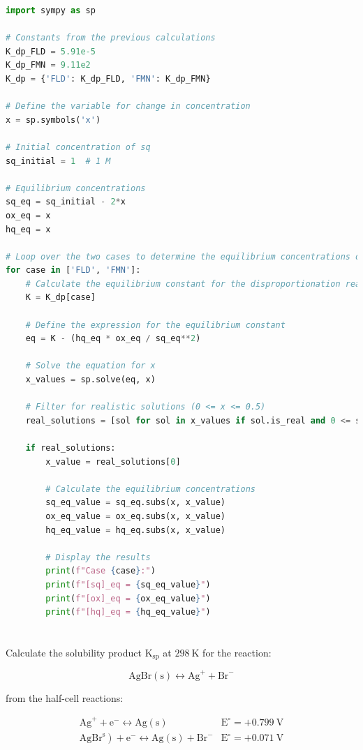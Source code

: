 \documentclass[12pt]{article}
\begin{document}
\begin{lstlisting}[language=Python]
import sympy as sp

# Constants from the previous calculations
K_dp_FLD = 5.91e-5
K_dp_FMN = 9.11e2
K_dp = {'FLD': K_dp_FLD, 'FMN': K_dp_FMN}

# Define the variable for change in concentration
x = sp.symbols('x')

# Initial concentration of sq
sq_initial = 1  # 1 M

# Equilibrium concentrations
sq_eq = sq_initial - 2*x
ox_eq = x
hq_eq = x

# Loop over the two cases to determine the equilibrium concentrations of the three species in each case
for case in ['FLD', 'FMN']:
    # Calculate the equilibrium constant for the disproportionation reaction
    K = K_dp[case]

    # Define the expression for the equilibrium constant
    eq = K - (hq_eq * ox_eq / sq_eq**2)

    # Solve the equation for x
    x_values = sp.solve(eq, x)

    # Filter for realistic solutions (0 <= x <= 0.5)
    real_solutions = [sol for sol in x_values if sol.is_real and 0 <= sol <= 0.5]
    
    if real_solutions:
        x_value = real_solutions[0]
        
        # Calculate the equilibrium concentrations
        sq_eq_value = sq_eq.subs(x, x_value)
        ox_eq_value = ox_eq.subs(x, x_value)
        hq_eq_value = hq_eq.subs(x, x_value)

        # Display the results
        print(f"Case {case}:")
        print(f"[sq]_eq = {sq_eq_value}")
        print(f"[ox]_eq = {ox_eq_value}")
        print(f"[hq]_eq = {hq_eq_value}")

\end{lstlisting}

\section{}
Calculate the solubility product $\mathrm{K}_{\mathrm{sp}}$ at $298 \mathrm{~K}$ for the reaction:

$$
\mathrm{AgBr}(\mathrm{s}) \leftrightarrow \mathrm{Ag}^{+}+\mathrm{Br}^{-}
$$

from the half-cell reactions:

$$
\begin{array}{ll}
\mathrm{Ag}^{+}+\mathrm{e}^{-} \leftrightarrow \mathrm{Ag}(\mathrm{s}) & \mathrm{E}^{\circ}=+0.799 \mathrm{~V} \\
\left.\mathrm{AgBr}^{\mathrm{s}}\right)+\mathrm{e}^{-} \leftrightarrow \mathrm{Ag}(\mathrm{s})+\mathrm{Br}^{-} & \mathrm{E}^{\circ}=+0.071 \mathrm{~V}
\end{array}
$$
\end{document}
